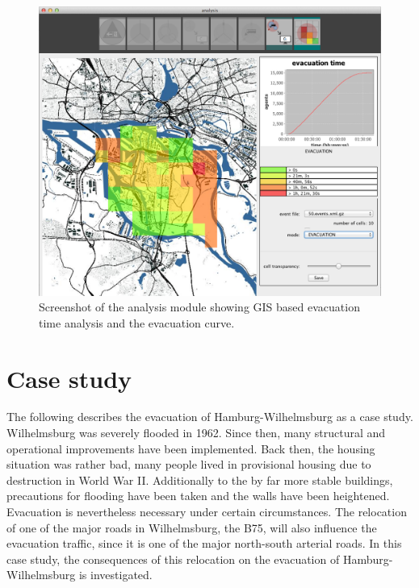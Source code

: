 \begin{figure}
\includegraphics[width=1\textwidth]{extending/figures/Evacuation/it50_evac_time}
\caption{Screenshot of the analysis module showing GIS based evacuation time analysis and the evacuation curve.}\label{chap:evac:fig:analysis}
\end{figure}


\section{Case study}
The following describes the evacuation of Hamburg-Wilhelmsburg as a case study. Wilhelmsburg was severely flooded in 1962. Since then, many structural and operational improvements have been implemented. Back then, the housing situation was rather bad, many people lived in provisional housing due to destruction in World War II. Additionally to the by far more stable buildings, precautions for flooding have been taken and the walls have been heightened. Evacuation is nevertheless necessary under certain circumstances. The relocation of one of the major roads in Wilhelmsburg, the B75, will also influence the evacuation traffic, since it is one of the major north-south arterial roads. In this case study, the consequences of this relocation on the evacuation of Hamburg-Wilhelmsburg is investigated.



